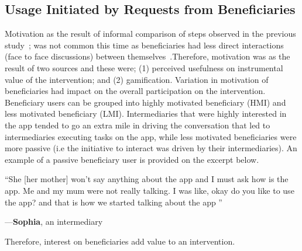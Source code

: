 \documentclass{sig-alternate}
\newenvironment{myquote}
               {\list{}{\rightmargin   \leftmargin
                        \parsep        0in }%
                \item\relax}
               {\endlist}
\newcommand{\userquote}[2]{\begin{samepage}\begin{myquote} 
     \em{\small{#2\begin{flushright}---#1\end{flushright}}}
   \end{myquote}\end{samepage}}
\begin{document}
\subsection*{\textbf{Usage Initiated by Requests from Beneficiaries}}
Motivation as the result of informal comparison of steps observed in the previous study~\cite{katule2016:leveraging}; was not common this time as beneficiaries had less direct interactions (face to face discussions) between themselves~\cite{katule2016:leveraging}.Therefore, motivation was as the result of two sources and these were; (1) perceived usefulness on instrumental value of the intervention; and (2) gamification. Variation in  motivation of beneficiaries had impact on the overall participation on the intervention. Beneficiary users can be grouped into highly motivated beneficiary (HMI) and less motivated beneficiary (LMI). Intermediaries that were highly interested in the app tended to go an extra mile in driving the conversation that led to intermediaries executing tasks on the app, while less motivated beneficiaries were more passive (i.e the initiative to interact was driven by their intermediaries). An example of a passive beneficiary user is provided on the excerpt below.

\userquote{\textbf{Sophia}, an intermediary} {``She [her mother] won't say anything about the app and I must ask how is the app. Me and my mum were not really talking. I was like, okay do you like to use the app? and that is how we started talking about the app ''} 

Therefore, interest on beneficiaries add value to an intervention.
\end{document}
